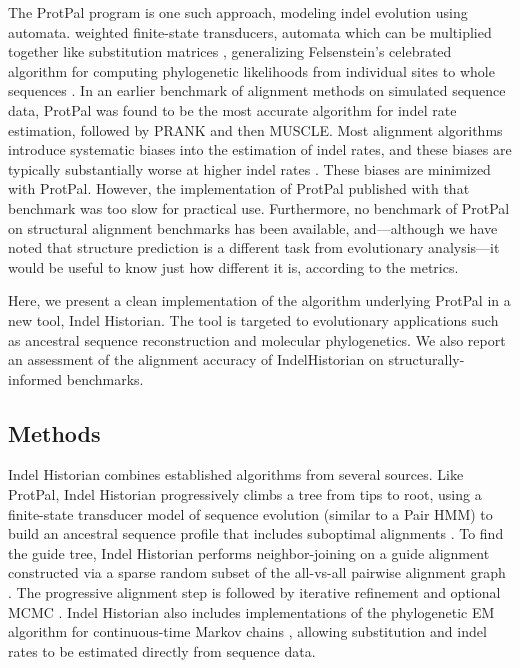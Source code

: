 \documentclass{bioinfo}
\begin{document}
The ProtPal program \citep{Westesson2012-zg} is one such approach, modeling indel evolution using automata.
weighted finite-state transducers,
automata which can be multiplied together like substitution matrices \citep{BouchardCote2013},
generalizing Felsenstein's celebrated
algorithm for computing phylogenetic likelihoods from individual sites to whole sequences \citep{Felsenstein81}.
In an earlier benchmark of alignment methods on simulated sequence data,
ProtPal was found to be the most accurate algorithm for indel rate estimation,
followed by PRANK and then MUSCLE.
Most alignment algorithms introduce systematic biases into the
estimation of indel rates, and these biases are typically substantially worse
at higher indel rates \citep{Westesson2012-zg}.
These biases are minimized with ProtPal.
However, the implementation of ProtPal published with that benchmark was too slow
for practical use.
Furthermore, no benchmark of ProtPal on structural alignment benchmarks has been available,
and---although we have noted that structure prediction is a different task from evolutionary analysis---it would be
useful to know just how different it is, according to the metrics.

Here, we present a clean implementation of the algorithm underlying ProtPal
in a new tool, Indel Historian.
The tool is targeted to evolutionary applications such
as ancestral sequence reconstruction and molecular phylogenetics.
We also report an assessment of the alignment accuracy of IndelHistorian on structurally-informed benchmarks.

\begin{methods}
\section{Methods}

Indel Historian combines established algorithms from several sources.
Like ProtPal, Indel Historian progressively climbs a tree from tips to root,
using a finite-state transducer model of sequence evolution (similar to a Pair HMM)
to build an ancestral sequence profile that includes suboptimal alignments \citep{Westesson2012-zg}.
To find the guide tree, Indel Historian performs neighbor-joining \citep{SaitouNei87}
on a guide alignment constructed via a sparse random subset of the all-vs-all pairwise alignment graph \citep{BradleyEtAl2009}.
The progressive alignment step is followed by iterative refinement \citep{HolmesBruno2001,Edgar2004b} and optional MCMC \citep{WestessonBarquistHolmes2012}.
Indel Historian also includes implementations of the phylogenetic EM algorithm for continuous-time Markov chains \citep{HolmesRubin2002},
allowing substitution and indel rates to be estimated directly from sequence data.

\end{methods}
\end{document}
